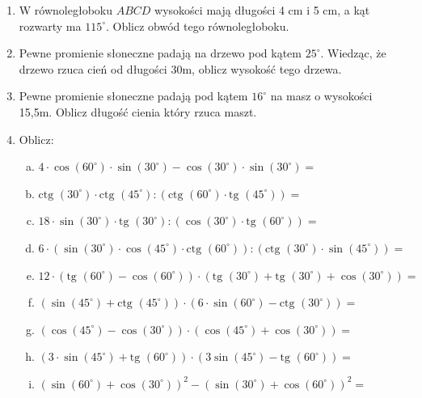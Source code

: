 \documentclass[12pt,a4paper]{article}
\begin{document}
\begin{enumerate}[1.]
		\begin{enumerate}[a)] \begin{tabular}{p{7cm} p{7cm}}
			\item $\sin\alpha=\frac{5}{13}$& \vspace{0.4cm} \item $\cos\alpha=0,5$ \\
			\item $\cos\alpha=\frac{\sqrt{5}}{5}$& \item $\text{ctg } \alpha=\frac{1}{\sqrt{3}}$ \\
			\item $\text{tg }\alpha=2$& \item $\sin\alpha=\frac{1}{\sqrt{3}}$ \\
		\end{tabular} \end{enumerate}
	
		\item W równoległoboku $ABCD$ wysokości mają długości 4 cm i 5 cm, a kąt rozwarty ma $115^\circ$. Oblicz obwód tego równoległoboku.
		
		\item Pewne promienie słoneczne padają na drzewo pod kątem $25^\circ$. Wiedząc, że drzewo rzuca cień od długości 30m, oblicz wysokość tego drzewa.
		
		\item Pewne promienie słoneczne padają pod kątem $16^\circ$ na masz o wysokości 15,5m. Oblicz długość cienia który rzuca maszt.
		
		\item Oblicz:
		
		\begin{enumerate}[a)]
			\item $4\cdot \cos(60^\circ)\cdot \sin(30^\circ)-\cos(30^\circ)\cdot\sin(30^\circ)=$
			\item $\text{ctg }(30^\circ)\cdot\text{ctg }(45^\circ):(\text{ctg }(60^\circ)\cdot \text{tg }(45^\circ))=$
			\item $18\cdot \sin(30^\circ)\cdot\text{tg }(30^\circ):(\cos(30^\circ)\cdot\text{tg }(60^\circ))=$
			\item $6\cdot (\sin(30^\circ)\cdot\cos(45^\circ)\cdot\text{ctg }(60^\circ)):(\text{ctg }(30^\circ)\cdot\sin(45^\circ))=$	
			\item $12\cdot(\text{tg }(60^\circ)-\cos(60^\circ))\cdot(\text{tg }(30^\circ)+\text{tg }(30^\circ)+\cos(30^\circ))=$	
			\item $(\sin(45^\circ)+\text{ctg }(45^\circ))\cdot(6\cdot\sin(60^\circ)-\text{ctg }(30^\circ))=$	
			\item $(\cos(45^\circ)-\cos(30^\circ))\cdot(\cos(45^\circ)+\cos(30^\circ))=$
			\item $(3\cdot \sin(45^\circ)+\text{tg }(60^\circ))\cdot(3\sin(45^\circ)-\text{tg }(60^\circ))=$
			\item $(\sin(60^\circ)+\cos(30^\circ))^2-(\sin(30^\circ)+\cos(60^\circ))^2=$
		\end{enumerate}
	

\end{enumerate}
\end{document}
